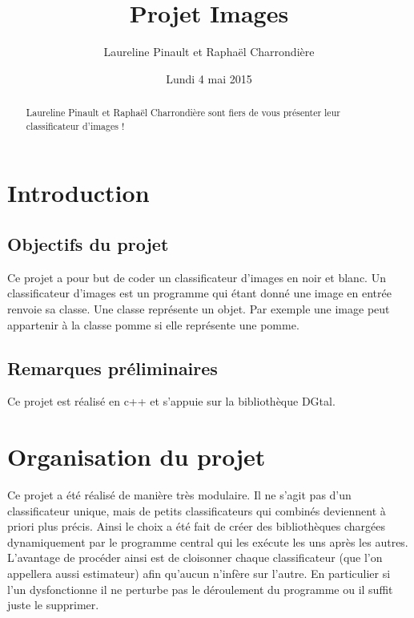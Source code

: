 \documentclass{article}
\title{Projet Images}
\author[$\dag$]{Laureline Pinault et Raphaël Charrondière}
\affil[$\dag$]{ENS de Lyon, France}
\date{Lundi 4 mai 2015}
\begin{document}
  \maketitle

  \begin{abstract}
	Laureline Pinault et Raphaël Charrondière sont fiers de vous présenter leur classificateur d'images !
  \end{abstract}
  
  \newpage

  \tableofcontents

  \newpage
  
  \section{Introduction}

    \subsection{Objectifs du projet}
    	Ce projet a pour but de coder un classificateur d'images en noir et blanc. Un classificateur d'images est un programme qui étant donné une image en entrée renvoie sa classe. Une classe représente un objet. Par exemple une image peut appartenir à la classe pomme si elle représente une pomme.

    \subsection{Remarques préliminaires}    	
    	Ce projet est réalisé en c++  et s'appuie sur la bibliothèque DGtal.
    	  
  \section{Organisation du projet} %
  	Ce projet a été réalisé de manière très modulaire. Il ne s'agit pas d'un classificateur unique, mais de petits classificateurs qui combinés deviennent à priori plus précis. Ainsi le choix a été fait de créer des bibliothèques chargées dynamiquement par le programme central qui les exécute les uns après les autres. L'avantage de procéder ainsi est de cloisonner chaque classificateur (que l'on appellera aussi estimateur) afin qu'aucun n'infère sur l'autre. En particulier si l'un dysfonctionne il ne perturbe pas le déroulement du programme ou il suffit juste le supprimer.
  	   
\end{document}
